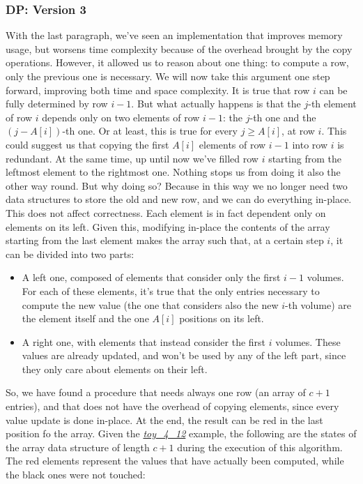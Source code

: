 \documentclass[12pt]{extarticle}
\begin{document}
\subsubsection{DP: Version 3}
With the last paragraph, we've seen an implementation that improves memory usage, but worsens time complexity because of the overhead brought by the copy operations. However, it allowed us to reason about one thing: to compute a row, only the previous one is necessary. We will now take this argument one step forward, improving both time and space complexity.\newline
It is true that row $i$ can be fully determined by row $i-1$. But what actually happens is that the $j$-th element of row $i$ depends only on two elements of row $i-1$: the $j$-th one and the $(j-A[i])$-th one. Or at least, this is true for every $j \geq A[i]$, at row $i$. This could suggest us that copying the first $A[i]$ elements of row $i-1$ into row $i$ is redundant.\newline
At the same time, up until now we've filled row $i$ starting from the leftmost element to the rightmost one. Nothing stops us from doing it also the other way round. But why doing so? Because in this way we no longer need two data structures to store the old and new row, and we can do everything in-place. This does not affect correctness. Each element is in fact dependent only on elements on its left. Given this, modifying in-place the contents of the array starting from the last element makes the array such that, at a certain step $i$, it can be divided into two parts:
\begin{itemize}
    \item A left one, composed of elements that consider only the first $i-1$ volumes. For each of these elements, it's true that the only entries necessary to compute the new value (the one that considers also the new $i$-th volume) are the element itself and the one $A[i]$ positions on its left.
    \item A right one, with elements that instead consider the first $i$ volumes. These values are already updated, and won't be used by any of the left part, since they only care about elements on their left.
\end{itemize}
So, we have found a procedure that needs always one row (an array of $c+1$ entries), and that does not have the overhead of copying elements, since every value update is done in-place. At the end, the result can be red in the last position fo the array. Given the \hyperref[marker-toy-4-12]{\emph{toy\_4\_12}} example, the following are the states of the array data structure of length $c+1$ during the execution of this algorithm. The red elements represent the values that have actually been computed, while the black ones were not touched:
\end{document}
